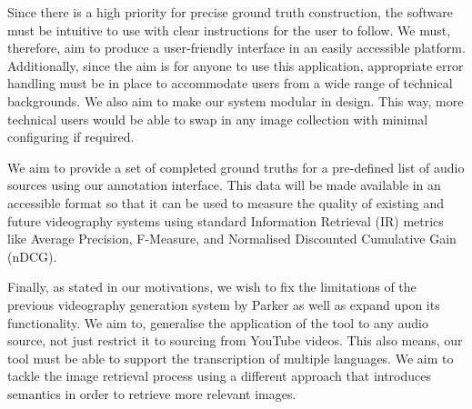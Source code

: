 \documentclass{l4proj}
\begin{document}
Since there is a high priority for precise ground truth construction, the software must be intuitive to use with clear instructions for the user to follow. We must, therefore, aim to produce a user-friendly interface in an easily accessible platform. Additionally, since the aim is for anyone to use this application, appropriate error handling must be in place to accommodate users from a wide range of technical backgrounds. We also aim to make our system modular in design. This way, more technical users would be able to swap in any image collection with minimal configuring if required.

We aim to provide a set of completed ground truths for a pre-defined list of audio sources using our annotation interface. This data will be made available in an accessible format so that it can be used to measure the quality of existing and future videography systems using standard Information Retrieval (IR) metrics like Average Precision, F-Measure, and Normalised Discounted Cumulative Gain (nDCG).

Finally, as stated in our motivations, we wish to fix the limitations of the previous videography generation system by Parker as well as expand upon its functionality. We aim to, generalise the application of the tool to any audio source, not just restrict it to sourcing from YouTube videos. This also means, our tool must be able to support the transcription of multiple languages. We aim to tackle the image retrieval process using a different approach that introduces semantics in order to retrieve more relevant images.




\end{document}
